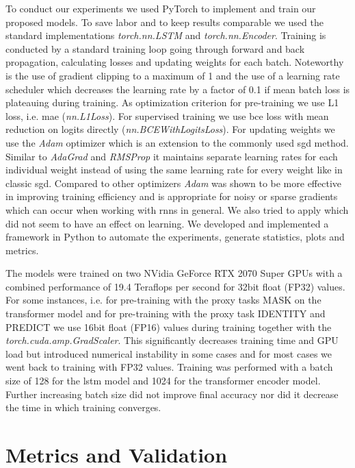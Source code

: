 To conduct our experiments we used PyTorch \cite{pytorch} to implement and train our proposed models. To save labor and to keep results comparable we used the standard implementations \textit{torch.nn.LSTM} and \textit{torch.nn.Encoder}. Training is conducted by a standard training loop going through forward and back propagation, calculating losses and updating weights for each batch. Noteworthy is the use of gradient clipping to a maximum of 1 and the use of a learning rate scheduler which decreases the learning rate by a factor of 0.1 if mean batch loss is plateauing during training. As optimization criterion for pre-training we use L1 loss, i.e. \gls{mae} (\textit{nn.L1Loss}). For supervised training we use \gls{bce} loss with mean reduction on logits directly (\textit{nn.BCEWithLogitsLoss}).
For updating weights we use the \textit{Adam} optimizer \cite{adam} which is an extension to the commonly used \gls{sgd} method. Similar to \textit{AdaGrad} \cite{optimizer_comparison} and \textit{RMSProp} \cite{optimizer_comparison} it maintains separate learning rates for each individual weight instead of using the same learning rate for every weight like in classic \gls{sgd}. Compared to other optimizers \textit{Adam} was shown to be more effective in improving training efficiency \cite{adam} and is appropriate for noisy or sparse gradients which can occur when working with \glspl{rnn} in general. We also tried to apply \cite{AdamW} which did not seem to have an effect on learning.
We developed and implemented a framework in Python to automate the experiments, generate statistics, plots and metrics. \par
The models were trained on two NVidia GeForce RTX 2070 Super GPUs with a combined performance of 19.4 Teraflops per second for 32bit float (FP32) values. For some instances, i.e. for pre-training with the proxy tasks MASK on the transformer model and for pre-training with the proxy task IDENTITY and PREDICT we use 16bit float (FP16) values during training together with the \textit{torch.cuda.amp.GradScaler}. This significantly decreases training time and GPU load but introduced numerical instability in some cases and for most cases we went back to training with FP32 values. Training was performed with a batch size of 128 for the \gls{lstm} model and 1024 for the transformer encoder model. Further increasing batch size did not improve final accuracy nor did it decrease the time in which training converges. \par

\section{Metrics and Validation}

